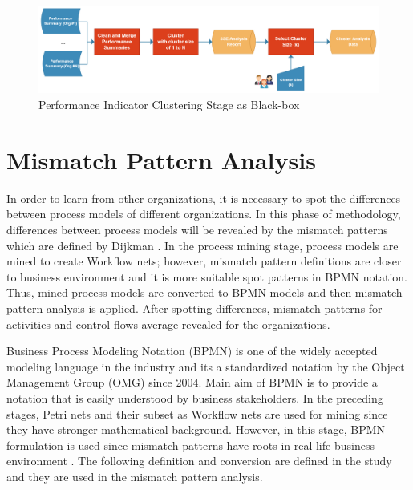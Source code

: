 \begin{figure}
  \centering
  \includegraphics[width=\textwidth]{4_methodology/performance-indicator-clustering-blackbox}
  \caption{Performance Indicator Clustering Stage as Black-box }
  \label{fig:performance-indicator-clustering-blackbox}
\end{figure}
 
\section{Mismatch Pattern Analysis}
\label{sec:mismatch-pattern-analysis}
In order to learn from other organizations, it is necessary to spot the differences between process models of different organizations. In this phase of methodology, differences between process models will be revealed by the mismatch patterns which are defined by Dijkman \cite{dijkman2007mismatch}. In the process mining stage, process models are mined to create Workflow nets; however, mismatch pattern definitions are closer to business environment and it is more suitable spot patterns in BPMN notation. Thus, mined process models are converted to BPMN models and then mismatch pattern analysis is applied. After spotting differences, mismatch patterns for activities and control flows average revealed for the organizations.

Business Process Modeling Notation (BPMN) is one of the widely accepted modeling language in the industry and its a standardized notation by the Object Management Group (OMG) since 2004. Main aim of BPMN is to provide a notation that is easily understood by business stakeholders. In the preceding stages, Petri nets and their subset as Workflow nets are used for mining since they have stronger mathematical background. However, in this stage, BPMN formulation is used since mismatch patterns have roots in real-life business environment \cite{dijkman2007mismatch}. The following definition and conversion are defined in the study \cite{kalenkovaprocess} and they are used in the mismatch pattern analysis. 

